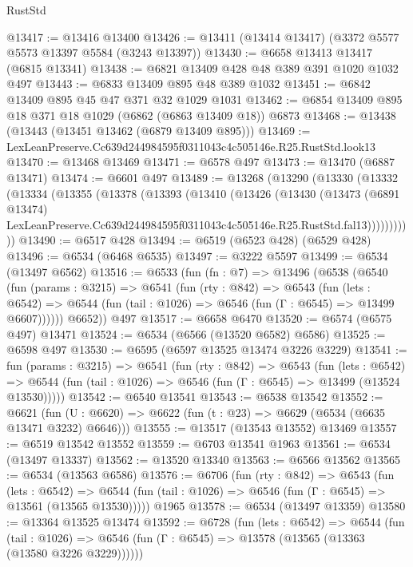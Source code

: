 \begin{lexlean}{RustStd}
\begin{coremodule}
@13417 := @13416 @13400
@13426 := @13411 (@13414 @13417) (@3372 @5577 @5573 @13397 @5584 (@3243 @13397))
@13430 := @6658 @13413 @13417 (@6815 @13341)
@13438 := @6821 @13409 @428 @48 @389 @391 @1020 @1032 @497
@13443 := @6833 @13409 @895 @48 @389 @1032
@13451 := @6842 @13409 @895 @45 @47 @371 @32 @1029 @1031
@13462 := @6854 @13409 @895 @18 @371 @18 @1029 (@6862 (@6863 @13409 @18)) @6873
@13468 := @13438 (@13443 (@13451 @13462 (@6879 @13409 @895)))
@13469 := LexLeanPreserve.Cc639d244984595f0311043c4c505146e.R25.RustStd.look13
@13470 := @13468 @13469
@13471 := @6578 @497
@13473 := @13470 (@6887 @13471)
@13474 := @6601 @497
@13489 := @13268
    (@13290
      (@13330
        (@13332
          (@13334
            (@13355
              (@13378
                (@13393
                  (@13410
                    (@13426
                      (@13430
                        (@13473
                          (@6891 @13474)
                          LexLeanPreserve.Cc639d244984595f0311043c4c505146e.R25.RustStd.fal13)))))))))))
@13490 := @6517 @428
@13494 := @6519 (@6523 @428) (@6529 @428)
@13496 := @6534 (@6468 @6535)
@13497 := @3222 @5597
@13499 := @6534 (@13497 @6562)
@13516 := @6533
    (fun (fn : @7) =>
    @13496
      (@6538
        (@6540
          (fun (params : @3215) =>
          @6541
            (fun (rty : @842) =>
            @6543
              (fun (lets : @6542) =>
              @6544 (fun (tail : @1026) => @6546 (fun (Γ : @6545) => @13499 @6607))))))
        @6652))
    @497
@13517 := @6658 @6470
@13520 := @6574 (@6575 @497) @13471
@13524 := @6534 (@6566 (@13520 @6582) @6586)
@13525 := @6598 @497
@13530 := @6595 (@6597 @13525 @13474 @3226 @3229)
@13541 := fun (params : @3215) =>
  @6541
    (fun (rty : @842) =>
    @6543
      (fun (lets : @6542) =>
      @6544 (fun (tail : @1026) => @6546 (fun (Γ : @6545) => @13499 (@13524 @13530)))))
@13542 := @6540 @13541
@13543 := @6538 @13542
@13552 := @6621
    (fun (U : @6620) => @6622 (fun (t : @23) => @6629 (@6534 (@6635 @13471 @3232) @6646)))
@13555 := @13517 (@13543 @13552) @13469
@13557 := @6519 @13542 @13552
@13559 := @6703 @13541 @1963
@13561 := @6534 (@13497 @13337)
@13562 := @13520 @13340
@13563 := @6566 @13562
@13565 := @6534 (@13563 @6586)
@13576 := @6706
    (fun (rty : @842) =>
    @6543
      (fun (lets : @6542) =>
      @6544 (fun (tail : @1026) => @6546 (fun (Γ : @6545) => @13561 (@13565 @13530)))))
    @1965
@13578 := @6534 (@13497 @13359)
@13580 := @13364 @13525 @13474
@13592 := @6728
    (fun (lets : @6542) =>
    @6544
      (fun (tail : @1026) =>
      @6546 (fun (Γ : @6545) => @13578 (@13565 (@13363 (@13580 @3226 @3229))))))

\end{coremodule}
\end{lexlean}
